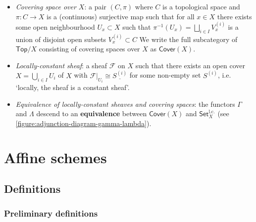 \documentclass[10pt]{article}
\newcommand{\Set}{\mathsf{Set}}
\newcommand{\Top}{\mathsf{Top}}
\newcommand{\Cover}{\mathsf{Cover}}
\newcommand{\lc}{\mathrm{l.c.}}
\newcommand{\fsheaf}{\mathcal{F}}
\begin{document}
                \begin{itemize}
                    \item \textit{Covering space over $X$}: a pair $(C,\pi)$ where $C$ is a topological space and $\pi\colon C\to X$ is a (continuous) surjective map such that for all $x\in X$ there exists some open neighbourhood $U_x\subset X$ such that $\pi^{-1}(U_x)=\bigsqcup_{i\in I} V_x^{(i)}$ is a union of disjoint open subsets $V_x^{(i)}\subset C$
                        We write the full subcategory of $\Top/X$ consisting of covering spaces over $X$ as $\Cover(X)$.
                    \item \textit{Locally-constant sheaf}: a sheaf $\fsheaf$ on $X$ such that there exists an open cover $X=\bigcup_{i\in I} U_i$ of $X$ with $\fsheaf|_{U_i}\cong \underline{S^{(i)}}$ for some non-empty set $S^{(i)}$, i.e. `locally, the sheaf is a constant sheaf'.
                    \item \textit{Equivalence of locally-constant sheaves and covering spaces}: the functors $\Gamma$ and $\Lambda$ descend to an \textbf{equivalence} between $\Cover(X)$ and $\Set_X^\lc$ (see \cref{figure:adjunction-diagram-gamma-lambda}).
                \end{itemize}
                
    \section{Affine schemes}
    
        \subsection{Definitions}
        
            \subsubsection{Preliminary definitions}\label{subsubsection:preliminary-definitions-affine-schemes}
        
\end{document}
